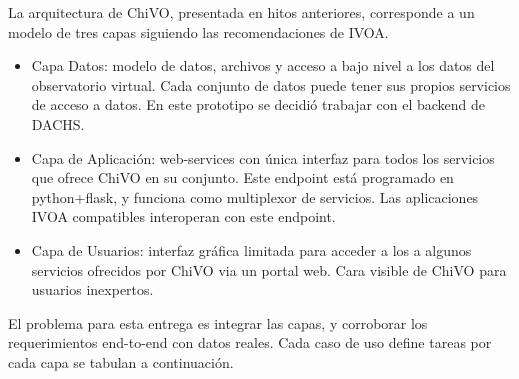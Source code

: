 La arquitectura de ChiVO, presentada en hitos anteriores, corresponde
a un modelo de tres capas siguiendo las recomendaciones de IVOA.

\begin{itemize}
\item Capa Datos: modelo de datos, archivos y acceso a bajo nivel 
a los datos del observatorio virtual. Cada conjunto de datos puede
tener sus propios servicios de acceso a datos. En este prototipo
se decidió trabajar con el backend de DACHS.
\item Capa de Aplicación: web-services con única interfaz para todos
los servicios que ofrece ChiVO en su conjunto. Este endpoint está programado en
python+flask, y funciona como multiplexor de servicios. Las aplicaciones
IVOA compatibles interoperan con este endpoint.
\item Capa de Usuarios: interfaz gráfica limitada para acceder a los
a algunos servicios ofrecidos por ChiVO via un portal web. Cara visible
de ChiVO para usuarios inexpertos.
\end{itemize}

El problema para esta entrega es integrar las capas, y corroborar
los requerimientos end-to-end con datos reales. Cada caso de uso
define tareas por cada capa se tabulan a continuación.

